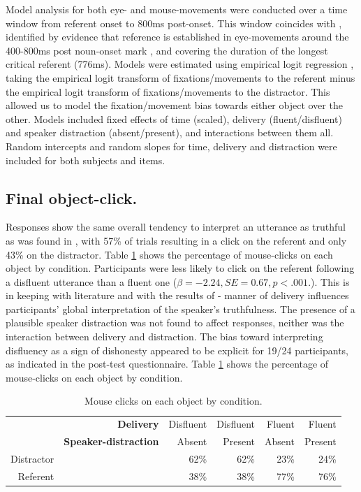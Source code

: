 \documentclass[a4paper,man,natbib]{apa6}
\begin{document}
Model analysis for both eye- and mouse-movements were conducted over a time window from referent onset to 800ms post-onset. 
This window coincides with \citet{Loy2016}, identified by evidence that reference is established in eye-movements around the 400-800ms post noun-onset mark \citep{Eberhard1995}, and covering the duration of the longest critical referent (776ms). 
Models were estimated using empirical logit regression \citep{Barr2008}, taking the empirical logit transform of fixations/movements to the referent minus the empirical logit transform of fixations/movements to the distractor.
This allowed us to model the fixation/movement bias towards either object over the other. 
Models included fixed effects of time (scaled), delivery (fluent/disfluent) and speaker distraction (absent/present), and interactions between them all. 
Random intercepts and random slopes for time, delivery and distraction were included for both subjects and items. \\

\subsection{Final object-click.}
Responses show the same overall tendency to interpret an utterance as truthful as was found in \citet{Loy2016}, with 57\% of trials resulting in a click on the referent and only 43\% on the distractor. 
Table \ref{table:objctclck} shows the percentage of mouse-clicks on each object by condition.
Participants were less likely to click on the referent following a disfluent utterance than a fluent one ($\beta = -2.24,SE = 0.67,p<.001.$). 
This is in keeping with literature \citep{Brennan1995, Swerts2005} and with the results of \citet{Loy2016} - manner of delivery influences participants' global interpretation of the speaker's truthfulness. 
The presence of a plausible speaker distraction was not found to affect responses, neither was the interaction between delivery and distraction. 
The bias toward interpreting disfluency as a sign of dishonesty appeared to be explicit for 19/24 participants, as indicated in the post-test questionnaire. 
Table \ref{table:objctclck} shows the percentage of mouse-clicks on each object by condition.\\

\begin{table}[ht]
\centering
\begin{tabular}{rrrrrr}
  \hline
& \textbf{Delivery} & Disfluent & Disfluent & Fluent & Fluent \\ 
& \textbf{Speaker-distraction} & Absent & Present & Absent & Present \\
  \hline
Distractor & &  62\% &  62\% &  23\% &  24\% \\ 
  Referent & &  38\% &  38\% &  77\% &  76\% \\ 
   \hline
\end{tabular}
\caption{Mouse clicks on each object by condition.}
\label{table:objctclck}
\end{table}
\end{document}
